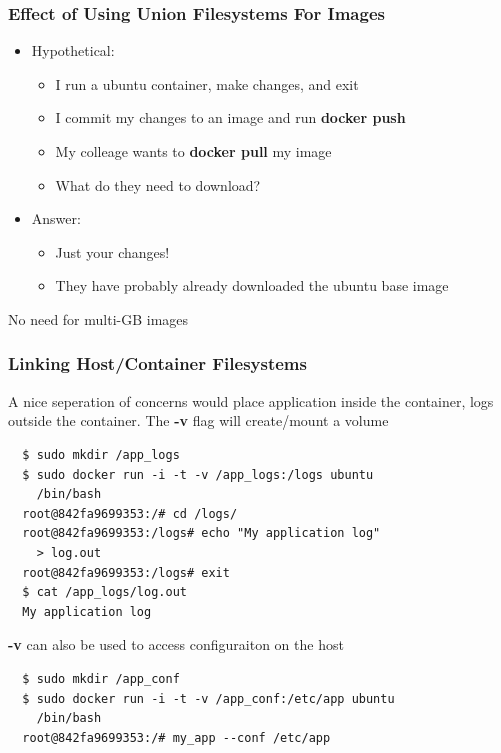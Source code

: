 \documentclass[xcolor=dvipsnames]{beamer}
\begin{document}
\begin{frame}[fragile]
 \frametitle{Effect of Using Union Filesystems For Images}

  \begin{itemize}
    \item Hypothetical:
      \begin{itemize}
      \item I run a ubuntu container, make changes, and exit
      \item I commit my changes to an image and run \textbf{docker push}
      \item My colleage wants to \textbf{docker pull} my image
      \item What do they need to download?
      \end{itemize}
    \item Answer: 
      \begin{itemize}
      \item Just your changes!
      \item They have probably already downloaded the ubuntu base image
      \end{itemize}
  \end{itemize}

  No need for multi-GB images
 
\end{frame}

\begin{frame}[fragile]
 \frametitle{Linking Host/Container Filesystems}

 \vspace{-2mm}
 A nice seperation of concerns would place application inside the container, logs outside the container. 
 The \textbf{-v} flag will create/mount a volume 

  \vspace{-1mm}
  \begin{lstlisting}
  $ sudo mkdir /app_logs
  $ sudo docker run -i -t -v /app_logs:/logs ubuntu 
    /bin/bash
  root@842fa9699353:/# cd /logs/
  root@842fa9699353:/logs# echo "My application log" 
    > log.out
  root@842fa9699353:/logs# exit
  $ cat /app_logs/log.out
  My application log
  \end{lstlisting}
  \vspace{-1mm}

  \textbf{-v} can also be used to access configuraiton on the host

  \vspace{-1mm}
  \begin{lstlisting}
  $ sudo mkdir /app_conf
  $ sudo docker run -i -t -v /app_conf:/etc/app ubuntu 
    /bin/bash
  root@842fa9699353:/# my_app --conf /etc/app
  \end{lstlisting}  


\end{frame}
\end{document}
